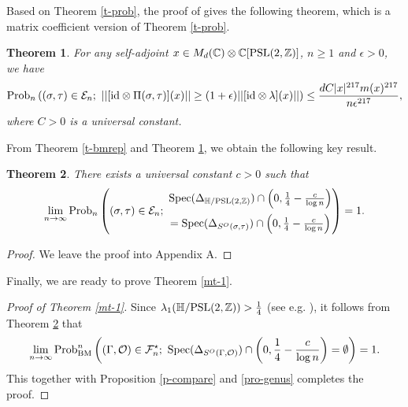 \documentclass{amsart}
\theoremstyle{plain}
\newtheorem{theorem}{Theorem}[section]
\newcommand{\bp}{\begin{proof}}
\newcommand{\ep}{\end{proof}}
\newcommand{\bt}{\begin{theorem}}
\newcommand{\et}{\end{theorem}}
\theoremstyle{definition}
\theoremstyle{remark}
\begin{document}
Based on Theorem \ref{t-prob}, the proof of \cite[Theorem 3.4]{MPvH25} gives the following theorem, which is a matrix coefficient version of Theorem \ref{t-prob}.
   \begin{theorem}\label{t-prob-matrix}
       For any self-adjoint $x\in M_d(\mathbb{C})\otimes\mathbb{C}[\textnormal{PSL}(2,\mathbb{Z})]$, $n\geq 1$ and $\epsilon>0$, we have 
       $$\textnormal{Prob}_n\left((\sigma,\tau)\in\mathcal{E}_n;\ ||[\textnormal{id}\otimes\Pi(\sigma,\tau)](x)||\geq (1+\epsilon)||[\textnormal{id}\otimes\lambda](x)||\right)\leq\frac{dC|x|^{217}m(x)^{217}}{n\epsilon^{217}},$$
       where $C>0$ is a universal constant.
   \end{theorem}
 From Theorem \ref{t-bmrep} and Theorem \ref{t-prob-matrix}, we obtain the following key result.
\bt\label{mt-oc}
There exists a universal constant $c>0$ such that
 \begin{equation}\label{e-gap}
      \begin{aligned}\lim\limits_{n\to\infty}\textnormal{Prob}_n\left((\sigma,\tau)\in\mathcal{E}_n;\ \begin{matrix}\textnormal{Spec}(\Delta_{\mathbb{H}/\textnormal{PSL}(2,\mathbb{Z})})\cap\left(0,\frac{1}{4}-\frac{c}{\log n} \right) \vspace{5pt}\\ 
      =\textnormal{Spec}(\Delta_{S^O(\sigma,\tau)})\cap\left(0,\frac{1}{4}-\frac{c}{\log n}\right)\end{matrix}\right)=1. \nonumber
       \end{aligned}\end{equation}  
\et

\bp
We leave the proof  into Appendix A.
\ep



     Finally, we are ready to prove Theorem \ref{mt-1}. 
   \begin{proof}[Proof of Theorem \ref{mt-1}]
      Since $\lambda_1(\mathbb{H}/\textnormal{PSL}(2,\mathbb{Z}))>\frac{1}{4}$ (see e.g. \cite[Theorem 3.38]{Be-book}),       
       it follows from Theorem \ref{mt-oc} that 
       \begin{align}\label{e-cusp}\lim\limits_{n\to\infty}\textnormal{Prob}_{\textnormal{BM}}^n\left((\Gamma,\mathcal{O})\in\mathcal{F}_n^\star;\ \textnormal{Spec}(\Delta_{S^O(\Gamma,\mathcal{O})})\cap\left(0,\frac{1}{4}-\frac{c}{\log n}\right)=\emptyset\right)=1. \nonumber
       \end{align}
       This together with Proposition \ref{p-compare} and \eqref{pro-genus} completes the proof.
   \end{proof} 
\appendix
\end{document}
